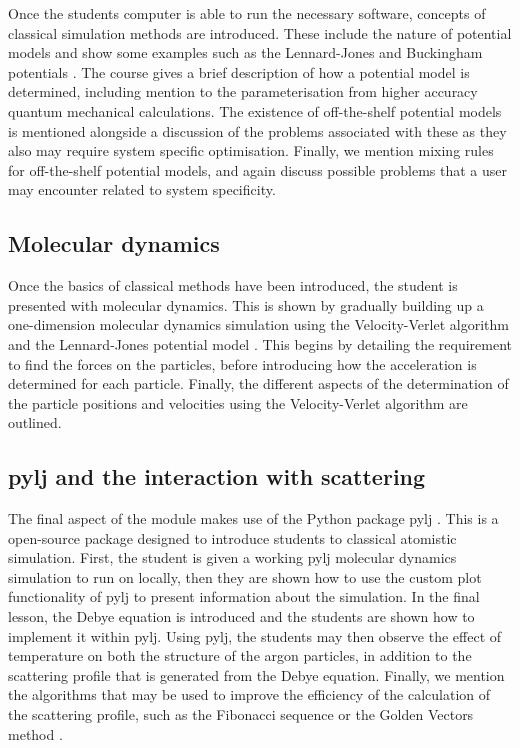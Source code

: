 \documentclass[amsmath,amssymb,twocolumn,superscriptaddress,aps,prl]{revtex4-1}
\begin{document}
Once the students computer is able to run the necessary software, concepts of classical simulation methods are introduced.
These include the nature of potential models and show some examples such as the Lennard-Jones and Buckingham potentials \cite{LennardJones1924,Buckingham1938}.
The course gives a brief description of how a potential model is determined, including mention to the parameterisation from higher accuracy quantum mechanical calculations.
The existence of off-the-shelf potential models is mentioned alongside a discussion of the problems associated with these as they also may require system specific optimisation.
Finally, we mention mixing rules for off-the-shelf potential models, and again discuss possible problems that a user may encounter related to system specificity.

\subsection{Molecular dynamics}

Once the basics of classical methods have been introduced, the student is presented with molecular dynamics.
This is shown by gradually building up a one-dimension molecular dynamics simulation using the Velocity-Verlet algorithm \cite{Swope1982} and the Lennard-Jones potential model \cite{LennardJones1924}.
This begins by detailing the requirement to find the forces on the particles, before introducing how the acceleration is determined for each particle.
Finally, the different aspects of the determination of the particle positions and velocities using the Velocity-Verlet algorithm are outlined.

\subsection{pylj and the interaction with scattering}

The final aspect of the module makes use of the Python package pylj \cite{McCluskey2018}.
This is a open-source package designed to introduce students to classical atomistic simulation.
First, the student is given a working pylj molecular dynamics simulation to run on locally, then they are shown how to use the custom plot functionality of pylj to present information about the simulation.
In the final lesson, the Debye equation is introduced and the students are shown how to implement it within pylj.
Using pylj, the students may then observe the effect of temperature on both the structure of the argon particles, in addition to the scattering profile that is generated from the Debye equation.
Finally, we mention the algorithms that may be used to improve the efficiency of the calculation of the scattering profile, such as the Fibonacci sequence or the Golden Vectors method \cite{Svergun1994, Watson2013}.
\end{document}
